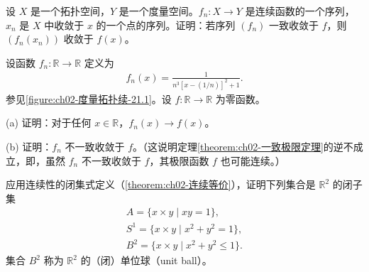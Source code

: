 \documentclass[../../main.tex]{subfiles}
\begin{document}
\begin{exercise}\label{exercise:ch02-度量拓扑续-8}
设 $X$ 是一个拓扑空间，$Y$ 是一个度量空间。$f_{n}: X \rightarrow Y$ 是连续函数的一个序列，$x_{n}$ 是 $X$ 中收敛于 $x$ 的一个点的序列。证明：若序列 $(f_{n})$ 一致收敛于 $f$，则 $(f_{n}(x_{n}))$ 收敛于 $f(x)$。
\end{exercise}

\begin{exercise}\label{exercise:ch02-度量拓扑续-9}
设函数 $f_{n}: \mathbb{R} \rightarrow \mathbb{R}$ 定义为
\begin{align*}
f_{n}(x) = \frac{1}{n^{3}[x - (1/n)]^{2} + 1}.
\end{align*}
参见\cref{figure:ch02-度量拓扑续-21.1}。设 $f: \mathbb{R} \rightarrow \mathbb{R}$ 为零函数。

(a) 证明：对于任何 $x \in \mathbb{R}$，$f_{n}(x) \rightarrow f(x)$。

(b) 证明：$f_{n}$ 不一致收敛于 $f$。（这说明定理\cref{theorem:ch02-一致极限定理}的逆不成立，即，虽然 $f_{n}$ 不一致收敛于 $f$，其极限函数 $f$ 也可能连续。）
\end{exercise}

\begin{exercise}\label{exercise:ch02-度量拓扑续-10}
应用连续性的闭集式定义（\cref{theorem:ch02-连续等价}），证明下列集合是 $\mathbb{R}^{2}$ 的闭子集
\begin{align*}
A = \{x \times y \mid xy = 1\}, \\
S^{1} = \{x \times y \mid x^{2} + y^{2} = 1\}, \\
B^{2} = \{x \times y \mid x^{2} + y^{2} \leqslant 1\}.
\end{align*}
集合 $B^{2}$ 称为 $\mathbb{R}^{2}$ 的（闭）单位球（unit ball）。
\end{exercise}
\end{document}

